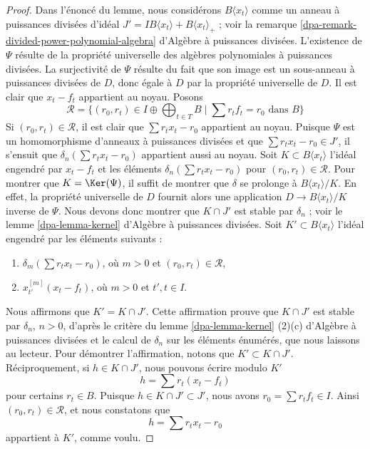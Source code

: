 \begin{proof}
Dans l'énoncé du lemme, nous considérons $B\langle x_t \rangle$
comme un anneau à puissances divisées d'idéal
$J' = IB\langle x_t \rangle + B\langle x_t \rangle_{+}$ ; voir la
remarque \ref{dpa-remark-divided-power-polynomial-algebra} d'Algèbre à puissances divisées.
L'existence de $\Psi$ résulte de la propriété universelle des
algèbres polynomiales à puissances divisées. La surjectivité de $\Psi$ résulte
du fait que son image est un sous-anneau à puissances divisées de $D$, donc égale à $D$
par la propriété universelle de $D$. Il est clair que
$x_t - f_t$ appartient au noyau. Posons
$$
\mathcal{R} = \{(r_0, r_t) \in I \oplus \bigoplus\nolimits_{t \in T} B
\mid \sum r_t f_t = r_0 \text{ dans }B\}
$$
Si $(r_0, r_t) \in \mathcal{R}$, il est clair que
$\sum r_t x_t - r_0$ appartient au noyau.
Puisque $\Psi$ est un homomorphisme d'anneaux à puissances divisées
et que $\sum r_tx_t - r_0 \in J'$,
il s'ensuit que $\delta_n(\sum r_t x_t - r_0)$ appartient aussi au noyau.
Soit $K \subset B\langle x_t \rangle$ l'idéal engendré par
$x_t - f_t$ et les éléments $\delta_n(\sum r_t x_t - r_0)$ pour
$(r_0, r_t) \in \mathcal{R}$.
Pour montrer que $K = \Ker(\Psi)$, il suffit de montrer que
$\delta$ se prolonge à $B\langle x_t \rangle/K$. En effet, la propriété
universelle de $D$ fournit alors une application $D \to B\langle x_t \rangle/K$
inverse de $\Psi$. Nous devons donc montrer que $K \cap J'$ est
stable par $\delta_n$ ; voir le
lemme \ref{dpa-lemma-kernel} d'Algèbre à puissances divisées.
Soit $K' \subset B\langle x_t \rangle$ l'idéal
engendré par les éléments suivants :
\begin{enumerate}
\item $\delta_m(\sum r_t x_t - r_0)$, où $m > 0$ et
$(r_0, r_t) \in \mathcal{R}$,
\item $x_{t'}^{[m]}(x_t - f_t)$, où $m > 0$ et $t', t \in I$.
\end{enumerate}
Nous affirmons que $K' = K \cap J'$. Cette affirmation prouve que $K \cap J'$
est stable par $\delta_n$, $n > 0$, d'après le critère du
lemme \ref{dpa-lemma-kernel} (2)(c) d'Algèbre à puissances divisées
et le calcul de $\delta_n$ sur
les éléments énumérés, que nous laissons au lecteur.
Pour démontrer l'affirmation, notons que $K' \subset K \cap J'$.
Réciproquement, si $h \in K \cap J'$, nous pouvons écrire modulo $K'$
$$
h = \sum r_t (x_t - f_t)
$$
pour certains $r_t \in B$. Puisque $h \in K \cap J' \subset J'$,
nous avons $r_0 = \sum r_t f_t \in I$. Ainsi $(r_0, r_t) \in \mathcal{R}$,
et nous constatons que
$$
h = \sum r_t x_t - r_0
$$
appartient à $K'$, comme voulu.
\end{proof}

